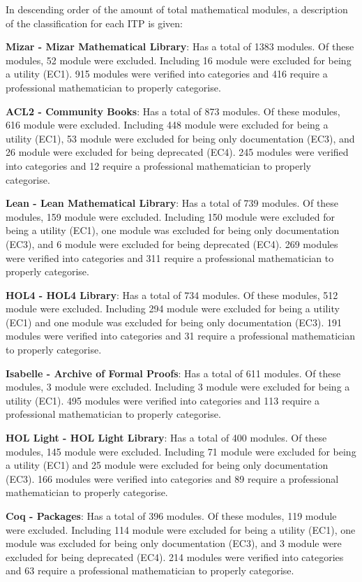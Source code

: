 \documentclass[
]{article}
\begin{document}
In descending order of the amount of total mathematical modules, a
description of the classification for each ITP is given:

\textbf{Mizar - Mizar Mathematical Library}: Has a total of 1383
modules. Of these modules, 52 module were excluded. Including 16 module
were excluded for being a utility (EC1). 915 modules were verified into
categories and 416 require a professional mathematician to properly
categorise.

\textbf{ACL2 - Community Books}: Has a total of 873 modules. Of these
modules, 616 module were excluded. Including 448 module were excluded
for being a utility (EC1), 53 module were excluded for being only
documentation (EC3), and 26 module were excluded for being deprecated
(EC4). 245 modules were verified into categories and 12 require a
professional mathematician to properly categorise.

\textbf{Lean - Lean Mathematical Library}: Has a total of 739 modules.
Of these modules, 159 module were excluded. Including 150 module were
excluded for being a utility (EC1), one module was excluded for being
only documentation (EC3), and 6 module were excluded for being
deprecated (EC4). 269 modules were verified into categories and 311
require a professional mathematician to properly categorise.

\textbf{HOL4 - HOL4 Library}: Has a total of 734 modules. Of these
modules, 512 module were excluded. Including 294 module were excluded
for being a utility (EC1) and one module was excluded for being only
documentation (EC3). 191 modules were verified into categories and 31
require a professional mathematician to properly categorise.

\textbf{Isabelle - Archive of Formal Proofs}: Has a total of 611
modules. Of these modules, 3 module were excluded. Including 3 module
were excluded for being a utility (EC1). 495 modules were verified into
categories and 113 require a professional mathematician to properly
categorise.

\textbf{HOL Light - HOL Light Library}: Has a total of 400 modules. Of
these modules, 145 module were excluded. Including 71 module were
excluded for being a utility (EC1) and 25 module were excluded for being
only documentation (EC3). 166 modules were verified into categories and
89 require a professional mathematician to properly categorise.

\textbf{Coq - Packages}: Has a total of 396 modules. Of these modules,
119 module were excluded. Including 114 module were excluded for being a
utility (EC1), one module was excluded for being only documentation
(EC3), and 3 module were excluded for being deprecated (EC4). 214
modules were verified into categories and 63 require a professional
mathematician to properly categorise.
\end{document}
